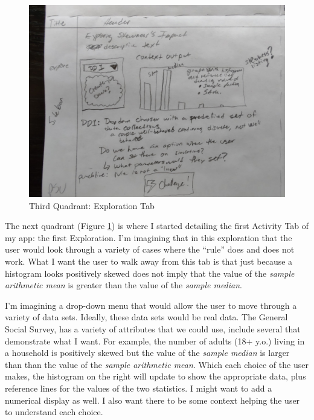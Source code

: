 \documentclass[
]{book}
\begin{document}
\begin{figure}

{\centering \includegraphics[width=22.22in]{images/planSketches/planSketch4-Explore} 

}

\caption{Third Quadrant: Exploration Tab}\label{fig:planSketchExplore}
\end{figure}

The next quadrant (Figure \ref{fig:planSketchExplore}) is where I started detailing the first Activity Tab of my app: the first Exploration. I'm imagining that in this exploration that the user would look through a variety of cases where the ``rule'' does and does not work. What I want the user to walk away from this tab is that just because a histogram looks positively skewed does not imply that the value of the \emph{sample arithmetic mean} is greater than the value of the \emph{sample median}.

I'm imagining a drop-down menu that would allow the user to move through a variety of data sets. Ideally, these data sets would be real data. The General Social Survey, has a variety of attributes that we could use, include several that demonstrate what I want. For example, the number of adults (18+ y.o.) living in a household is positively skewed but the value of the \emph{sample median} is larger than than the value of the \emph{sample arithmetic mean}. Which each choice of the user makes, the histogram on the right will update to show the appropriate data, plus reference lines for the values of the two statistics. I might want to add a numerical display as well. I also want there to be some context helping the user to understand each choice.
\end{document}
